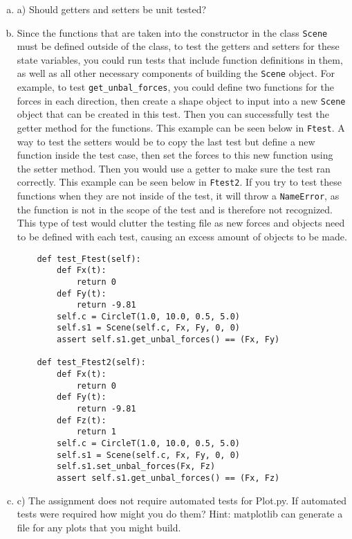 \documentclass[12pt]{article}
\begin{document}
\begin{enumerate}[a)]

\item a) Should getters and setters be unit tested?




\item Since the functions that are taken into the constructor in the class \verb|Scene| must be defined outside of the class, to test the getters and setters for these state variables, you could run tests that include function definitions in them, as well as all other necessary components of building the \verb|Scene| object. For example, to test \verb|get_unbal_forces|, you could define two functions for the forces in each direction, then create a shape object to input into a new \verb|Scene| object that can be created in this test. Then you can successfully test the getter method for the functions. This example can be seen below in \verb|Ftest|. A way to test the setters would be to copy the last test but define a new function inside the test case, then set the forces to this new function using the setter method. Then you would use a getter to make sure the test ran correctly. This example can be seen below in \verb|Ftest2|. If you try to test these functions when they are not inside of the test, it will throw a \verb|NameError|, as the function is not in the scope of the test and is therefore not recognized. This type of test would clutter the testing file as new forces and objects need to be defined with each test, causing an excess amount of objects to be made. 

\begin{verbatim}
    def test_Ftest(self):
        def Fx(t):
            return 0
        def Fy(t):
            return -9.81
        self.c = CircleT(1.0, 10.0, 0.5, 5.0)
        self.s1 = Scene(self.c, Fx, Fy, 0, 0)
        assert self.s1.get_unbal_forces() == (Fx, Fy)

    def test_Ftest2(self):
        def Fx(t):
            return 0
        def Fy(t):
            return -9.81
        def Fz(t):
            return 1
        self.c = CircleT(1.0, 10.0, 0.5, 5.0)
        self.s1 = Scene(self.c, Fx, Fy, 0, 0)
        self.s1.set_unbal_forces(Fx, Fz)
        assert self.s1.get_unbal_forces() == (Fx, Fz)
\end{verbatim}

\item c) The assignment does not require automated tests for Plot.py. If automated tests were required how might you do them? Hint: matplotlib can generate a file for any plots that you might build.





\end{enumerate}
\end{document}

